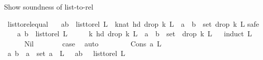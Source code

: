 \begin{isabellebody}
%
\endisatagproof
{\isafoldproof}%
%
\isadelimproof
%
\endisadelimproof
%
\begin{isamarkuptext}%
Show soundness of list-to-rel%
\end{isamarkuptext}\isamarkuptrue%
\isamarkupfalse%
\ list{\isacharunderscore}{\kern0pt}to{\isacharunderscore}{\kern0pt}rel{\isacharunderscore}{\kern0pt}equal{\isacharcolon}{\kern0pt}\ \isanewline
\ \ {\isachardoublequoteopen}{\isacharparenleft}{\kern0pt}a{\isacharcomma}{\kern0pt}b{\isacharparenright}{\kern0pt}\ {\isasymin}\ list{\isacharunderscore}{\kern0pt}to{\isacharunderscore}{\kern0pt}rel\ L\ {\isasymlongleftrightarrow}\ {\isacharparenleft}{\kern0pt}{\isasymexists}k{\isacharcolon}{\kern0pt}{\isacharcolon}{\kern0pt}nat{\isachardot}{\kern0pt}\ hd\ {\isacharparenleft}{\kern0pt}drop\ k\ L{\isacharparenright}{\kern0pt}\ {\isacharequal}{\kern0pt}\ a\ {\isasymand}\ b\ {\isasymin}\ set\ {\isacharparenleft}{\kern0pt}drop\ k\ L{\isacharparenright}{\kern0pt}{\isacharparenright}{\kern0pt}{\isachardoublequoteclose}\isanewline
%
\isadelimproof
%
\endisadelimproof
%
\isatagproof
{}\isamarkupfalse%
{\isacharparenleft}{\kern0pt}safe{\isacharparenright}{\kern0pt}\isanewline
\ \ \isamarkupfalse%
\ {\isachardoublequoteopen}{\isacharparenleft}{\kern0pt}a{\isacharcomma}{\kern0pt}\ b{\isacharparenright}{\kern0pt}\ {\isasymin}\ list{\isacharunderscore}{\kern0pt}to{\isacharunderscore}{\kern0pt}rel\ L{\isachardoublequoteclose}\isanewline
\ \ \isamarkupfalse%
\ \isamarkupfalse%
\ {\isachardoublequoteopen}{\isasymexists}k{\isachardot}{\kern0pt}\ hd\ {\isacharparenleft}{\kern0pt}drop\ k\ L{\isacharparenright}{\kern0pt}\ {\isacharequal}{\kern0pt}\ a\ {\isasymand}\ b\ {\isasymin}\ set\ \ {\isacharparenleft}{\kern0pt}drop\ k\ L{\isacharparenright}{\kern0pt}{\isachardoublequoteclose}\isanewline
\ \ \isamarkupfalse%
{\isacharparenleft}{\kern0pt}induct\ L{\isacharparenright}{\kern0pt}\isanewline
\ \ \ \ \isamarkupfalse%
\ Nil\isanewline
\ \ \ \ \isamarkupfalse%
\ \isamarkupfalse%
\ {\isacharquery}{\kern0pt}case\ \isamarkupfalse%
\ auto\isanewline
\ \ \isamarkupfalse%
\isanewline
\ \ \ \ \isamarkupfalse%
\ {\isacharparenleft}{\kern0pt}Cons\ a{}\ L{\isacharparenright}{\kern0pt}\isanewline
\ \ \ \ \isamarkupfalse%
\ \isamarkupfalse%
\ {\isachardoublequoteopen}{\isacharparenleft}{\kern0pt}a{\isacharcomma}{\kern0pt}\ b{\isacharparenright}{\kern0pt}\ {\isasymin}\ {\isacharbraceleft}{\kern0pt}a{}{\isacharbraceright}{\kern0pt}\ {\isasymtimes}\ set\ {\isacharparenleft}{\kern0pt}a{}\ {\isacharhash}{\kern0pt}\ L{\isacharparenright}{\kern0pt}\ {\isachardoublequoteclose}\ {\isacharbar}{\kern0pt}\ {\isachardoublequoteopen}{\isacharparenleft}{\kern0pt}a{\isacharcomma}{\kern0pt}b{\isacharparenright}{\kern0pt}\ {\isasymin}\ \ list{\isacharunderscore}{\kern0pt}to{\isacharunderscore}{\kern0pt}rel\ L{\isachardoublequoteclose}\ \isamarkupfalse%

\end{isabellebody}
